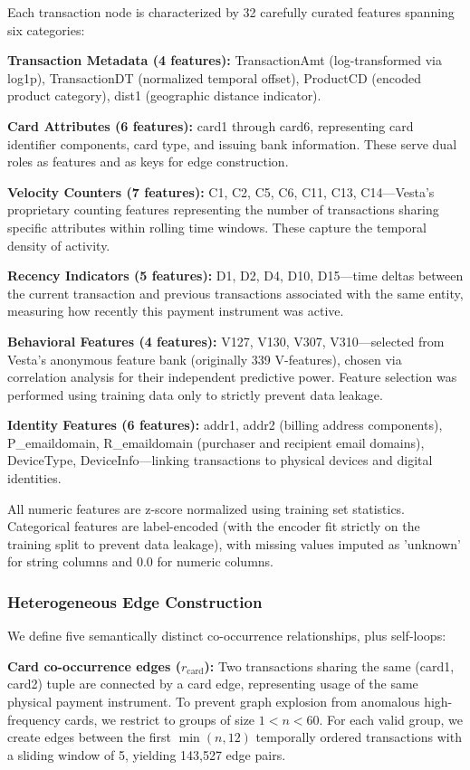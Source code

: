 \documentclass[journal]{IEEEtran}
\begin{document}
Each transaction node is characterized by 32 carefully curated features spanning six categories:

\textbf{Transaction Metadata (4 features):} TransactionAmt (log-transformed via log1p), TransactionDT (normalized temporal offset), ProductCD (encoded product category), dist1 (geographic distance indicator).

\textbf{Card Attributes (6 features):} card1 through card6, representing card identifier components, card type, and issuing bank information. These serve dual roles as features and as keys for edge construction.

\textbf{Velocity Counters (7 features):} C1, C2, C5, C6, C11, C13, C14---Vesta's proprietary counting features representing the number of transactions sharing specific attributes within rolling time windows. These capture the temporal density of activity.

\textbf{Recency Indicators (5 features):} D1, D2, D4, D10, D15---time deltas between the current transaction and previous transactions associated with the same entity, measuring how recently this payment instrument was active.

\textbf{Behavioral Features (4 features):} V127, V130, V307, V310---selected from Vesta's anonymous feature bank (originally 339 V-features), chosen via correlation analysis for their independent predictive power. Feature selection was performed using training data only to strictly prevent data leakage.

\textbf{Identity Features (6 features):} addr1, addr2 (billing address components), P\_emaildomain, R\_emaildomain (purchaser and recipient email domains), DeviceType, DeviceInfo---linking transactions to physical devices and digital identities.

All numeric features are z-score normalized using training set statistics. Categorical features are label-encoded (with the encoder fit strictly on the training split to prevent data leakage), with missing values imputed as 'unknown' for string columns and 0.0 for numeric columns. 

\subsubsection{Heterogeneous Edge Construction}

We define five semantically distinct co-occurrence relationships, plus self-loops:

\textbf{Card co-occurrence edges ($r_{\text{card}}$):} Two transactions sharing the same (card1, card2) tuple are connected by a card edge, representing usage of the same physical payment instrument. To prevent graph explosion from anomalous high-frequency cards, we restrict to groups of size $1 < n < 60$. For each valid group, we create edges between the first $\min(n, 12)$ temporally ordered transactions with a sliding window of 5, yielding 143,527 edge pairs. 
\end{document}
